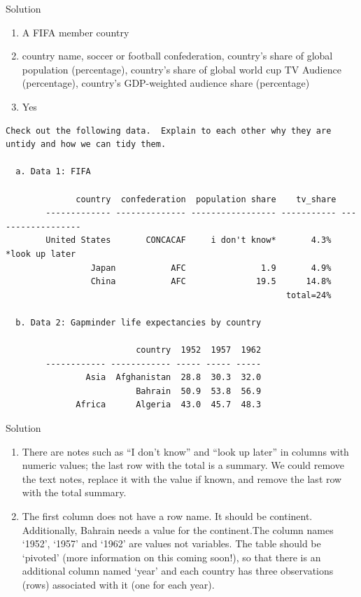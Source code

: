 \documentclass[
  letterpaper,
  DIV=11,
  numbers=noendperiod]{scrreprt}
\providecommand{\tightlist}{%
  \setlength{\itemsep}{0pt}\setlength{\parskip}{0pt}}\usepackage{longtable,booktabs,array}
\begin{document}
Solution

\begin{enumerate}
\def\labelenumi{\alph{enumi}.}
\tightlist
\item
  A FIFA member country
\item
  country name, soccer or football confederation, country's share of
  global population (percentage), country's share of global world cup TV
  Audience (percentage), country's GDP-weighted audience share
  (percentage)
\item
  Yes
\end{enumerate}

\hfill\break

\begin{verbatim}
Check out the following data.  Explain to each other why they are untidy and how we can tidy them.    
  
  a. Data 1: FIFA    
    
              country  confederation  population share    tv_share
        ------------- -------------- ----------------- ----------- ------------------
        United States       CONCACAF     i don't know*       4.3%  *look up later      
                 Japan           AFC               1.9       4.9%
                 China           AFC              19.5      14.8%    
                                                        total=24%           
  
  b. Data 2: Gapminder life expectancies by country    
        
                          country  1952  1957  1962
        ------------ ------------ ----- ----- -----
                Asia  Afghanistan  28.8  30.3  32.0
                          Bahrain  50.9  53.8  56.9    
              Africa      Algeria  43.0  45.7  48.3    
\end{verbatim}

Solution

\begin{enumerate}
\def\labelenumi{\alph{enumi}.}
\tightlist
\item
  There are notes such as ``I don't know'' and ``look up later'' in
  columns with numeric values; the last row with the total is a summary.
  We could remove the text notes, replace it with the value if known,
  and remove the last row with the total summary.
\item
  The first column does not have a row name. It should be continent.
  Additionally, Bahrain needs a value for the continent.The column names
  `1952', `1957' and `1962' are values not variables. The table should
  be `pivoted' (more information on this coming soon!), so that there is
  an additional column named `year' and each country has three
  observations (rows) associated with it (one for each year).
\end{enumerate}
\end{document}
